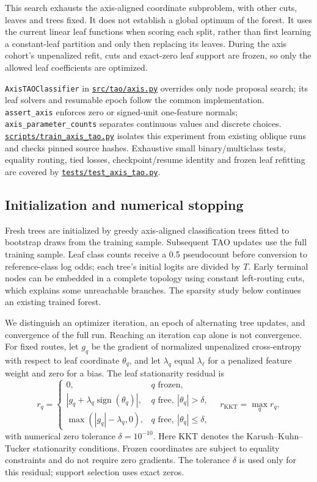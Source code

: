 \documentclass[11pt,a4paper]{article}
\newcommand{\code}[1]{{\small\texttt{\nolinkurl{#1}}}}
\newcommand{\file}[1]{\href{https://github.com/HephyAnalysisSW/oblique-tree-benchmark/blob/main/#1}{\nolinkurl{#1}}}
\begin{document}
This search exhausts the axis-aligned coordinate subproblem, with other cuts,
leaves and trees fixed. It does not establish a global optimum of the forest.
It uses the current linear leaf functions when scoring each split, rather than
first learning a constant-leaf partition and only then replacing its leaves.
During the axis cohort's unpenalized refit, cuts and exact-zero leaf support
are frozen, so only the allowed leaf coefficients are optimized.

\begin{implementation}
\code{AxisTAOClassifier} in \file{src/tao/axis.py} overrides only node proposal
search; its leaf solvers and resumable epoch follow the common implementation.
\code{assert_axis} enforces zero or signed-unit one-feature normals;
\code{axis_parameter_counts} separates continuous values and discrete choices.
\file{scripts/train_axis_tao.py} isolates this experiment from existing oblique
runs and checks pinned source hashes. Exhaustive small binary/multiclass tests,
equality routing, tied losses, checkpoint/resume identity and frozen leaf
refitting are covered by \file{tests/test_axis_tao.py}.
\end{implementation}

\subsection{Initialization and numerical stopping}
Fresh trees are initialized by greedy axis-aligned classification trees fitted
to bootstrap draws from the training sample. Subsequent TAO updates use the
full training sample. Leaf class counts receive a 0.5 pseudocount before
conversion to reference-class log odds; each tree's initial logits are divided
by $T$. Early terminal nodes can be embedded in a complete topology using
constant left-routing cuts, which explains some unreachable branches. The
sparsity study below continues an existing trained forest.

We distinguish an optimizer iteration, an epoch of alternating tree updates,
and convergence of the full run. Reaching an iteration cap alone is not
convergence. For fixed routes, let $g_q$ be the gradient of normalized
unpenalized cross-entropy with respect to leaf coordinate $\theta_q$, and let
$\lambda_q$ equal $\lambda_\ell$ for a penalized feature weight and zero for
a bias. The leaf stationarity residual is
\begin{equation}
 r_q=\begin{cases}
 0,&q\text{ frozen},\\
 |g_q+\lambda_q\operatorname{sign}(\theta_q)|,&q\text{ free},\ |\theta_q|>\delta,\\
 \max(|g_q|-\lambda_q,0),&q\text{ free},\ |\theta_q|\leq\delta,
 \end{cases}
 \quad r_{\mathrm{KKT}}=\max_q r_q,
 \label{eq:kkt}
\end{equation}
with numerical zero tolerance $\delta=10^{-10}$. Here KKT denotes the
Karush--Kuhn--Tucker stationarity conditions. Frozen coordinates are subject
to equality constraints and do not require zero gradients. The tolerance
$\delta$ is used only for this residual; support selection uses exact zeros.
\end{document}
